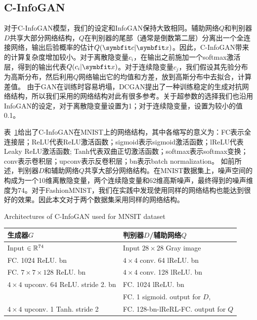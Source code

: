 \subsection{C-InfoGAN}
对于C-InfoGAN模型，我们的设定和InfoGAN保持大致相同。辅助网络$Q$和判别器$D$共享大部分网络结构，$Q$在判别器的尾部（通常是倒数第二层）分离出一个全连接网络，输出后验概率的估计$Q(\bd{c}|\bd{x})$。因此，C-InfoGAN带来的计算复杂度增加较小。对于离散隐变量$c_i$，在输出之前施加一个softmax激活层，得到的输出代表$Q(c_i|\bd{x})$。对于连续隐变量$c_j$，我们假设其先验分布为高斯分布，然后利用$Q$网络输出它的均值和方差，放到高斯分布中去拟合，计算差值。
由于GAN在训练时容易坍塌，DCGAN\citep{radford2015unsupervised}提出了一种训练稳定的生成对抗网络结构，所以我们采用的网络结构对此有很多参考。关于超参数的选择我们也沿用InfoGAN的设定，对于离散隐变量设置为1；对于连续隐变量，设置为较小的值0.1。

表~\ref{tab:m-cig-netarch}给出了C-InfoGAN在MNIST上的网络结构，其中各缩写的意义为：FC表示全连接层；ReLU代表ReLU激活函数；sigmoid表示sigmoid激活函数；lReLU代表Leaky ReLU激活函数; Tanh代表双曲正切激活函数；softmax表示softmax变换；conv表示卷积层；upconv表示反卷积层；bn表示batch normalization。
如前所述，判别器$D$和辅助网络$Q$共享大部分网络结构。在MNIST数据集上，噪声空间的构成为一个10维离散隐变量，两个连续隐变量和62维高斯噪声，最终得到的噪声维度为74。对于FashionMNIST，我们在实践中发现使用同样的网络结构也能达到很好的效果。因此本文对于两个数据集采用同样的网络结构。
\begin{table}[htbp]
  \centering
  {Architectures of C-InfoGAN used for MNSIT dataset}
  \begin{tabular}{l|l}
    \toprule
    \textbf{生成器$G$}                        & \textbf{判别器$D$/辅助网络$Q$} \\ \midrule
    Input $\in \mathbb{R}^{74}$                   & Input $28\times 28$ Gray image \\ \hline
    FC. 1024 ReLU. bn                         & $4\times 4$ conv. 64 lReLU. bn  \\ \hline
    FC. $7\times7\times128$ ReLU. bn          & $4\times 4$ conv. 128 lReLU. bn \\ \hline
    $4\times 4$ upconv. 64 ReLU. stride 2. bn & FC. 1024 lReLU. bn \\ \hline
    ~                                         & FC. 1 sigmoid. output for $D$, \\
    $4\times 4$ upconv. 1 Tanh. stride 2      & FC. 128-bn-lReRL-FC. output for $Q$ \\
    \bottomrule
  \end{tabular}
  \label{tab:m-cig-netarch}
\end{table}

